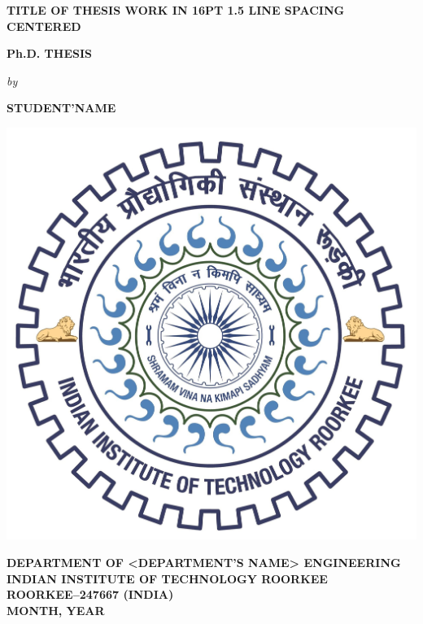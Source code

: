 \thispagestyle{empty}
\begin{titlepage}
    \onehalfspacing
	\centering
	{\fontsize{16}{19.2}\selectfont \bfseries \MakeUppercase {Title of thesis work in 16pt 1.5 line spacing centered}}
	\vspace{5\baselineskip}
	
	{\bfseries {Ph.D. THESIS}}
	\vspace{5\baselineskip}
	
	
	
	
	{\itshape{by}}
	\vspace{5\baselineskip}
	
	{\bfseries \MakeUppercase{student'name}}
	\vspace{5\baselineskip}
	
	
%	
	
	
	\includegraphics[width=0.27\linewidth]{image/iitrlogo.jpg}	
	\vspace{2\baselineskip}

    \singlespacing
	{\fontsize{14}{16.8}\selectfont \bfseries \MakeUppercase {DEPARTMENT OF <department's name> ENGINEERING\\ INDIAN INSTITUTE OF TECHNOLOGY ROORKEE\\ ROORKEE--247667 (INDIA)\\ month, year}}
	

\end{titlepage}

\newpage
\thispagestyle{empty}
\mbox{}